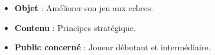 \begin{titlepage}
\vfill

\begin{itemize}[leftmargin=1cm, label=, itemsep=1pt]
\item {\bf Objet} : Améliorer son jeu aux echecs.
\item {\bf Contenu} : Principes stratégique.%
\item {\bf Public concerné} : Joueur débutant et intermédiaire.
\end{itemize}

\end{titlepage}
